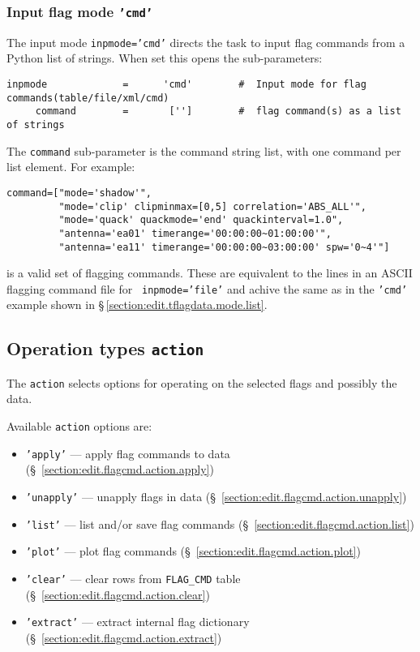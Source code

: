 \subsubsection{Input flag mode {\tt 'cmd'}}
\label{section:edit.flagcmd.inpmode.cmd}

The input mode {\tt inpmode='cmd'} directs the
task to input flag commands from a Python list of strings. 
When set this opens the sub-parameters:
\small
\begin{verbatim}
inpmode             =      'cmd'        #  Input mode for flag commands(table/file/xml/cmd)
     command        =       ['']        #  flag command(s) as a list of strings
\end{verbatim}
\normalsize
The {\tt command} sub-parameter is the command string list, with one
command per list element.  For example:
\small
\begin{verbatim}
command=["mode='shadow'",
         "mode='clip' clipminmax=[0,5] correlation='ABS_ALL'",
         "mode='quack' quackmode='end' quackinterval=1.0",
         "antenna='ea01' timerange='00:00:00~01:00:00'",
         "antenna='ea11' timerange='00:00:00~03:00:00' spw='0~4'"]
\end{verbatim}
\normalsize is a valid set of flagging commands.  These are equivalent
to the lines in an ASCII flagging command file for {\tt
  inpmode='file'} and achive the same as in the {\tt 'cmd'} example shown in
\S\,\ref{section:edit.tflagdata.mode.list}.

\subsection{Operation types {\tt action}}
\label{section:edit.flagcmd.action}

The {\tt action} selects options for operating on the selected
flags and possibly the data.

Available {\tt action} options are:
\begin{itemize}
   \item {\tt 'apply'} --- apply flag commands to data (\S~\ref{section:edit.flagcmd.action.apply})
   \item {\tt 'unapply'} --- unapply flags in data (\S~\ref{section:edit.flagcmd.action.unapply})
   \item {\tt 'list'} ---  list and/or save flag commands (\S~\ref{section:edit.flagcmd.action.list})
   \item {\tt 'plot'} --- plot flag commands (\S~\ref{section:edit.flagcmd.action.plot})
   \item {\tt 'clear'} --- clear rows from {\tt FLAG\_CMD} table (\S~\ref{section:edit.flagcmd.action.clear})
   \item {\tt 'extract'} --- extract internal flag dictionary (\S~\ref{section:edit.flagcmd.action.extract})
\end{itemize}

